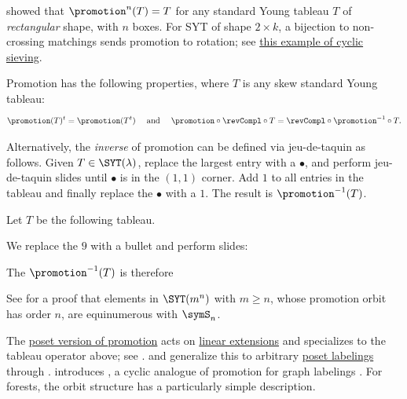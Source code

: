 showed that $\promotion^n(T)=T$
for any standard Young tableau $T$ of \emph{rectangular} shape, with $n$ boxes.
For SYT of shape $2 \times k$, a bijection to non-crossing matchings sends
promotion to rotation; see
\hyperref[cspNonCrossingMatchingsI]{this example of cyclic sieving}.

Promotion has the following properties, where $T$ is any skew standard Young tableau:
\[
\promotion(T)^t = \promotion(T^t)
\quad
\text{ and }
\quad
\promotion \circ \revCompl \circ T  = \revCompl \circ \promotion^{-1} \circ T.
\]

Alternatively, the \emph{inverse} of promotion can be defined via jeu-de-taquin as follows.
Given $T \in \SYT(\lambda)$, replace the largest entry with a $\bullet$,
and perform jeu-de-taquin slides until $\bullet$ is in the $(1,1)$ corner.
Add $1$ to all entries in the tableau and finally replace the $\bullet$ with a $1$.
The result is $\promotion^{-1}(T)$.

\begin{example*}
Let $T$ be the following tableau.
\begin{figure}
\end{figure}
We replace the $9$ with a bullet and perform slides:
\begin{figure}
\end{figure}
The $\promotion^{-1}(T)$ is therefore
\begin{figure}
\end{figure}
\end{example*}

See \cite{PurbhooRhee2017} for a proof that elements in $\SYT(m^n)$ with $m\geq n$,
whose promotion orbit has order $n$, are equinumerous with $\symS_n$.


The \hyperref[posetPromotion]{poset version of promotion} acts on
\hyperref[linearExtension]{linear extensions} and specializes to the tableau
operator above; see  \cite{Stanley2009}.
 and  generalize this to arbitrary
\hyperref[labeledPoset]{poset labelings} through
\label{promotionSorting}
\cite{DefantKravitz2022}.
 introduces
\label{toricPromotion}, a cyclic analogue of
promotion for graph labelings \cite{Defant2022ToricPromotion}.  For forests,
the orbit structure has a particularly simple description.

